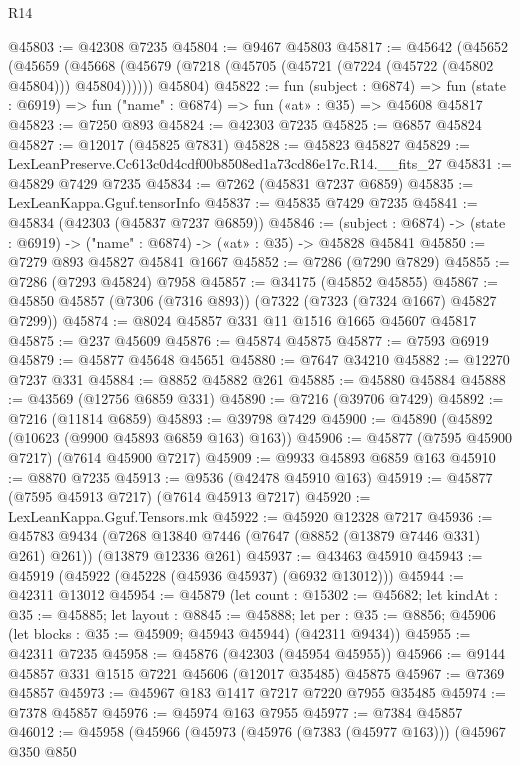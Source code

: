 \begin{lexlean}{R14}
\begin{coremodule}
@45803 := @42308 @7235
@45804 := @9467 @45803
@45817 := @45642
    (@45652
      (@45659 (@45668 (@45679 (@7218 (@45705 (@45721 (@7224 (@45722 (@45802 @45804))) @45804))))))
      @45804)
@45822 := fun (subject : @6874) =>
  fun (state : @6919) => fun ("name" : @6874) => fun («at» : @35) => @45608 @45817
@45823 := @7250 @893
@45824 := @42303 @7235
@45825 := @6857 @45824
@45827 := @12017 (@45825 @7831)
@45828 := @45823 @45827
@45829 := LexLeanPreserve.Cc613c0d4cdf00b8508ed1a73cd86e17c.R14.__fits_27
@45831 := @45829 @7429 @7235
@45834 := @7262 (@45831 @7237 @6859)
@45835 := LexLeanKappa.Gguf.tensorInfo
@45837 := @45835 @7429 @7235
@45841 := @45834 (@42303 (@45837 @7237 @6859))
@45846 := (subject : @6874) -> (state : @6919) -> ("name" : @6874) -> («at» : @35) -> @45828 @45841
@45850 := @7279 @893 @45827 @45841 @1667
@45852 := @7286 (@7290 @7829)
@45855 := @7286 (@7293 @45824) @7958
@45857 := @34175 (@45852 @45855)
@45867 := @45850 @45857 (@7306 (@7316 @893)) (@7322 (@7323 (@7324 @1667) @45827 @7299))
@45874 := @8024 @45857 @331 @11 @1516 @1665 @45607 @45817
@45875 := @237 @45609
@45876 := @45874 @45875
@45877 := @7593 @6919
@45879 := @45877 @45648 @45651
@45880 := @7647 @34210
@45882 := @12270 @7237 @331
@45884 := @8852 @45882 @261
@45885 := @45880 @45884
@45888 := @43569 (@12756 @6859 @331)
@45890 := @7216 (@39706 @7429)
@45892 := @7216 (@11814 @6859)
@45893 := @39798 @7429
@45900 := @45890 (@45892 (@10623 (@9900 @45893 @6859 @163) @163))
@45906 := @45877 (@7595 @45900 @7217) (@7614 @45900 @7217)
@45909 := @9933 @45893 @6859 @163
@45910 := @8870 @7235
@45913 := @9536 (@42478 @45910 @163)
@45919 := @45877 (@7595 @45913 @7217) (@7614 @45913 @7217)
@45920 := LexLeanKappa.Gguf.Tensors.mk
@45922 := @45920 @12328 @7217
@45936 := @45783
    @9434
    (@7268 @13840 @7446 (@7647 (@8852 (@13879 @7446 @331) @261) @261))
    (@13879 @12336 @261)
@45937 := @43463 @45910
@45943 := @45919 (@45922 (@45228 (@45936 @45937) (@6932 @13012)))
@45944 := @42311 @13012
@45954 := @45879
    (let count : @15302 := @45682;
    let kindAt : @35 := @45885;
    let layout : @8845 := @45888;
    let per : @35 := @8856; @45906 (let blocks : @35 := @45909; @45943 @45944) (@42311 @9434))
@45955 := @42311 @7235
@45958 := @45876 (@42303 (@45954 @45955))
@45966 := @9144 @45857 @331 @1515 @7221 @45606 (@12017 @35485) @45875
@45967 := @7369 @45857
@45973 := @45967 @183 @1417 @7217 @7220 @7955 @35485
@45974 := @7378 @45857
@45976 := @45974 @163 @7955
@45977 := @7384 @45857
@46012 := @45958
    (@45966
      (@45973
        (@45976 (@7383 (@45977 @163)))
        (@45967
          @350
          @850

\end{coremodule}
\end{lexlean}
